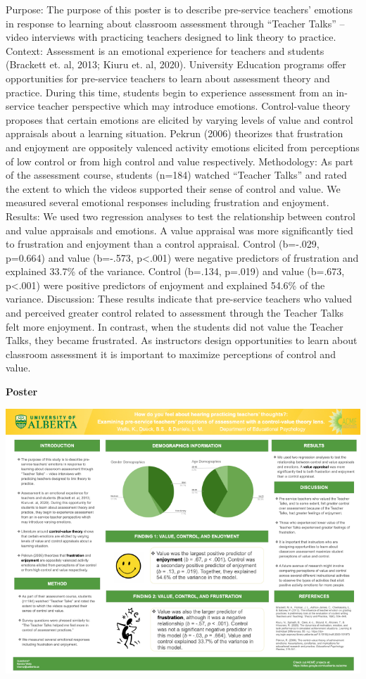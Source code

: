 \documentclass[
]{book}
\begin{document}
Purpose: The purpose of this poster is to describe pre-service teachers' emotions in response to learning about classroom assessment through ``Teacher Talks'' -- video interviews with practicing teachers designed to link theory to practice. Context: Assessment is an emotional experience for teachers and students (Brackett et. al, 2013; Kiuru et. al, 2020). University Education programs offer opportunities for pre-service teachers to learn about assessment theory and practice. During this time, students begin to experience assessment from an in-service teacher perspective which may introduce emotions. Control-value theory proposes that certain emotions are elicited by varying levels of value and control appraisals about a learning situation. Pekrun (2006) theorizes that frustration and enjoyment are oppositely valenced activity emotions elicited from perceptions of low control or from high control and value respectively. Methodology: As part of the assessment course, students (n=184) watched ``Teacher Talks'' and rated the extent to which the videos supported their sense of control and value. We measured several emotional responses including frustration and enjoyment. Results: We used two regression analyses to test the relationship between control and value appraisals and emotions. A value appraisal was more significantly tied to frustration and enjoyment than a control appraisal. Control (b=-.029, p=0.664) and value (b=-.573, p\textless.001) were negative predictors of frustration and explained 33.7\% of the variance. Control (b=.134, p=.019) and value (b=.673, p\textless.001) were positive predictors of enjoyment and explained 54.6\% of the variance. Discussion: These results indicate that pre-service teachers who valued and perceived greater control related to assessment through the Teacher Talks felt more enjoyment. In contrast, when the students did not value the Teacher Talks, they became frustrated. As instructors design opportunities to learn about classroom assessment it is important to maximize perceptions of control and value.

\textbf{Poster}

\includegraphics{Content/KW.png}
\end{document}
